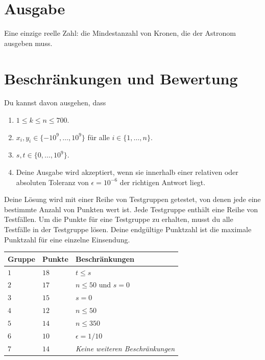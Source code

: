 \section*{Ausgabe}

Eine einzige reelle Zahl: die Mindestanzahl von Kronen, die der Astronom ausgeben muss.

\section*{Beschränkungen und Bewertung}

Du kannst davon ausgehen, dass 
\begin{enumerate}
\item $1\leq k\leq n\leq 700$. %
\item $x_i, y_i\in \{-10^9,\ldots, 10^9\}$ für alle $i\in\{1,\ldots,n\}$. %
\item $s,t\in \{0,\ldots, 10^9\}$. %
\item Deine Ausgabe wird akzeptiert, wenn sie innerhalb einer relativen oder absoluten Toleranz von $\epsilon = 10^{-6}$ der richtigen Antwort liegt.
\end{enumerate}


Deine Lösung wird mit einer Reihe von Testgruppen getestet, von denen jede eine bestimmte Anzahl von Punkten wert ist.
Jede Testgruppe enthält eine Reihe von Testfällen.
Um die Punkte für eine Testgruppe zu erhalten, musst du alle Testfälle in der Testgruppe lösen.
Deine endgültige Punktzahl ist die maximale Punktzahl für eine einzelne Einsendung.

\medskip
\noindent
\begin{tabular}{lll}
  Gruppe & Punkte & Beschränkungen\\\hline
  $1$ & $18$ &  $t\leq s$\\
  $2$ & $17$ & $n\le 50$ und $s=0$\\
  $3$ & $15$ & $s=0$\\
  $4$ & $12$ & $n\leq 50$\\
  $5$ & $14$ & $n\leq 350$\\
  $6$ & $10$ & $\epsilon = 1/10$\\
  $7$ & $14$ & \emph{Keine weiteren Beschränkungen}\\
\end{tabular}
